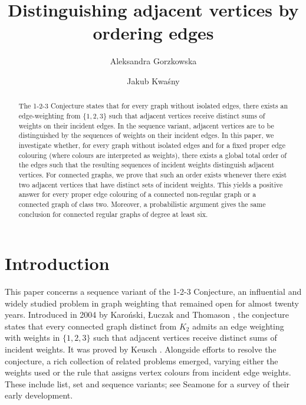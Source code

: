 \documentclass[a4paper,12pt]{elsarticle}
\begin{document}
\title{Distinguishing adjacent vertices by ordering edges}

\author[AGH]{Aleksandra Gorzkowska} 

\author[AGH]{Jakub Kwa\'sny} 

\address[AGH]{AGH University of Krakow, al. A. Mickiewicza 30, 30-059 Krakow, Poland}




\begin{abstract}
    The 1-2-3 Conjecture states that for every graph without isolated edges, there exists an edge-weighting from $\{1,2,3\}$ such that adjacent vertices receive distinct sums of weights on their incident edges. In the sequence variant, adjacent vertices are to be distinguished by the sequences of weights on their  incident edges. In this paper, we investigate whether, for every graph without isolated edges and for a fixed proper edge colouring (where colours are interpreted as weights), there exists a global total order of the edges such that the resulting sequences of incident weights distinguish adjacent vertices. For connected graphs, we prove that such an order exists whenever there exist two adjacent vertices that have distinct sets of incident weights. This yields a positive answer for every proper edge colouring of a connected non-regular graph or a connected graph of class two. Moreover, a probabilistic argument gives the same conclusion for connected regular graphs of degree at least six. 
\end{abstract}



\maketitle


\section{Introduction}

This paper concerns a sequence variant of the 1-2-3 Conjecture, an influential and widely studied problem in graph weighting that remained open for almost twenty years. Introduced in 2004 by Karoński, Łuczak and Thomason \cite{KaronskiLuczakThomason}, the conjecture states that every connected graph distinct from $K_2$ admits an edge weighting with weights in $\{1,2,3\}$ such that adjacent vertices receive distinct sums of incident weights. It was proved by Keusch \cite{Keusch}. Alongside efforts to resolve the conjecture, a rich collection of related problems emerged, varying either the weights used or the rule that assigns vertex colours from incident edge weights. These include list, set and sequence variants; see Seamone \cite{SeamoneSurvey} for a survey of their early development.
\end{document}
